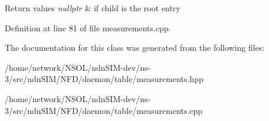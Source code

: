 \begin{DoxyRetVals}{Return values}
{\em nullptr} & if child is the root entry \\
\hline
\end{DoxyRetVals}


Definition at line 81 of file measurements.\+cpp.



The documentation for this class was generated from the following files\+:\begin{DoxyCompactItemize}
\item 
/home/network/\+N\+S\+O\+L/ndn\+S\+I\+M-\/dev/ns-\/3/src/ndn\+S\+I\+M/\+N\+F\+D/daemon/table/measurements.\+hpp\item 
/home/network/\+N\+S\+O\+L/ndn\+S\+I\+M-\/dev/ns-\/3/src/ndn\+S\+I\+M/\+N\+F\+D/daemon/table/measurements.\+cpp\end{DoxyCompactItemize}
